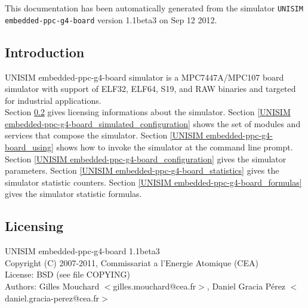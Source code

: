 This documentation has been automatically generated from the simulator \texttt{UNISIM embedded-ppc-g4-board} version 1.1beta3 on Sep 12 2012.
\subsection{Introduction}
UNISIM embedded-ppc-g4-board simulator is a MPC7447A/MPC107 board simulator with support of ELF32, ELF64, S19, and RAW binaries and targeted for industrial applications.\\
Section \ref{UNISIM embedded-ppc-g4-board_licensing} gives licensing informations about the simulator.
Section \ref{UNISIM embedded-ppc-g4-board_simulated_configuration} shows the set of modules and services that compose the simulator.
Section \ref{UNISIM embedded-ppc-g4-board_using} shows how to invoke the simulator at the command line prompt.
Section \ref{UNISIM embedded-ppc-g4-board_configuration} gives the simulator parameters.
Section \ref{UNISIM embedded-ppc-g4-board_statistics} gives the simulator statistic counters.
Section \ref{UNISIM embedded-ppc-g4-board_formulas} gives the simulator statistic formulas.
\subsection{Licensing}
\label{UNISIM embedded-ppc-g4-board_licensing}
UNISIM embedded-ppc-g4-board 1.1beta3\\
Copyright (C) 2007-2011, Commissariat a l'Energie Atomique (CEA)\\
License: BSD (see file COPYING)\\
Authors: Gilles Mouchard $<$gilles.mouchard@cea.fr$>$, Daniel Gracia P\'erez $<$daniel.gracia-perez@cea.fr$>$\\
